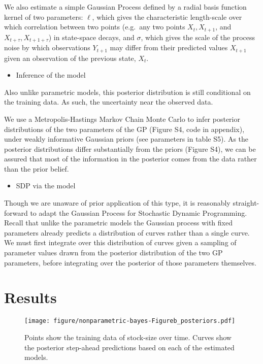 \documentclass[author-year, review]{elsarticle} %
\makeatletter
\def\maxwidth{\ifdim\Gin@nat@width>\linewidth\linewidth
\else\Gin@nat@width\fi}
\let\Oldincludegraphics\includegraphics
\renewcommand{\includegraphics}[1]{\Oldincludegraphics[width=\maxwidth]{#1}}
\makeatother
\begin{document}
We also estimate a simple Gaussian Process defined by a radial basis
function kernel of two parameters: $\ell$, which gives the
characteristic length-scale over which correlation between two points
(e.g.~any two points $X_t, X_{t+1}$, and $X_{t+\tau}, X_{t+1+\tau}$) in
state-space decays, and $\sigma$, which gives the scale of the process
noise by which observations $Y_{t+1}$ may differ from their predicted
values $X_{t+1}$ given an observation of the previous state, $X_t$.

\begin{itemize}
\itemsep1pt\parskip0pt
\item
  Inference of the model
\end{itemize}

Also unlike parametric models, this posterior distribution is still
conditional on the training data. As such, the uncertainty near the
observed data.

We use a Metropolis-Hastings Markov Chain Monte Carlo to infer posterior
distributions of the two parameters of the GP (Figure S4, code in
appendix), under weakly informative Gaussian priors (see parameters in
table S5). As the posterior distributions differ substantially from the
priors (Figure S4), we can be assured that most of the information in
the posterior comes from the data rather than the prior belief.

\begin{itemize}
\itemsep1pt\parskip0pt
\item
  SDP via the model
\end{itemize}

Though we are unaware of prior application of this type, it is
reasonably straight-forward to adapt the Gaussian Process for Stochastic
Dynamic Programming. Recall that unlike the parametric models the
Gaussian process with fixed parameters already predicts a distribution
of curves rather than a single curve. We must first integrate over this
distribution of curves given a sampling of parameter values drawn from
the posterior distribution of the two GP parameters, before integrating
over the posterior of those parameters themselves.

\section{Results}\label{results}

\begin{figure}[htbp]
\centering
\texttt{[image: figure/nonparametric-bayes-Figureb\_posteriors.pdf]}
\caption{Points show the training data of stock-size over time. Curves
show the posterior step-ahead predictions based on each of the estimated
models.}
\end{figure}
\end{document}
